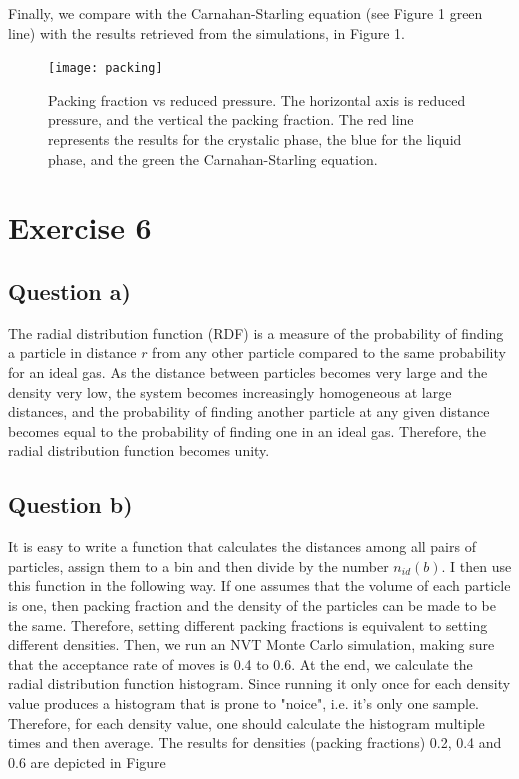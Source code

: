 \documentclass[11pt]{report}
\begin{document}
Finally, we compare with the Carnahan-Starling equation (see Figure 1 green line) with the results retrieved from the simulations, in Figure 1.

\begin{figure}[ht!]
	\begin{center}
		\texttt{[image: packing]}
		\caption{Packing fraction vs reduced pressure. The horizontal axis is reduced pressure, and the vertical the packing fraction. The red line represents the results for the crystalic phase, the blue for the liquid phase, and the green the Carnahan-Starling equation.}
	\end{center}
\end{figure}




\section*{Exercise 6}

\subsection*{Question a)}

The radial distribution function (RDF) is a measure of the probability of finding a particle in distance $r$ from any other particle compared to the same probability for an ideal gas. As the distance between particles becomes very large and the density very low, the system becomes increasingly homogeneous at large distances, and the probability of finding another particle at any given distance becomes equal to the probability of finding one in an ideal gas. Therefore, the radial distribution function becomes unity.

\subsection*{Question b)}

It is easy to write a function that calculates the distances among all pairs of particles, assign them to a bin and then divide by the number $n_{id}(b)$. I then use this function in the following way. If one assumes that the volume of each particle is one, then packing fraction and the density of the particles can be made to be the same. Therefore, setting different packing fractions is equivalent to setting different densities. Then, we run an NVT Monte Carlo simulation, making sure that the acceptance rate of moves is 0.4 to 0.6. At the end,  we calculate the radial distribution function histogram. Since running it only once for each density value produces a histogram that is prone to "noice", i.e. it's only one sample. Therefore, for each density value, one should calculate the histogram multiple times and then average. The results for densities (packing fractions) 0.2, 0.4 and 0.6 are depicted in Figure %
\end{document}
